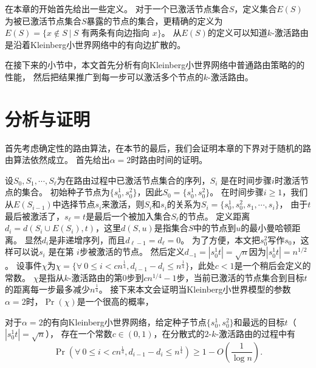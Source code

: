 在本章的开始首先给出一些定义。
对于一个已激活节点集合$S$，定义集合$E(S)$为被已激活节点集合$S$暴露的节点的集合，更精确的定义为
$E(S) = \{x\notin S\ |\ S \mbox{ 有两条有向边指向 } x\}$。
从$E(S)$的定义可以知道$k$-激活路由是沿着Kleinberg小世界网络中的有向边扩散的。

在接下来的小节中，本文首先分析有向Kleinberg小世界网络中普通路由策略的的性能，
然后把结果推广到每一步可以激活多个节点的$k$-激活路由。



\section{分析与证明}
首先考虑确定性的路由算法，在本节的最后，我们会证明本章的下界对于随机的路由算法依然成立。
首先给出$\alpha = 2$时路由时间的证明。

设$S_0, S_1,\cdots, S_{\ell}$为在路由过程中已激活节点集合的序列，$S_i$ 是在时间步骤$i$时激活节点的集合。
初始种子节点为$\{s_0^1,s_0^2\}$，因此$S_0 = \{s_0^1,s_0^2\}$。
在时间步骤$i \geq 1$，我们从$E(S_{i-1})$中选择节点$s_{i}$来激活，则$S_i$和$s_i$的关系为$S_i = \{s_0^1,s_0^2,s_1,\cdots,s_{i}\}$，
由于$t$最后被激活了，$s_{\ell}=t$是最后一个被加入集合$S_{\ell}$的节点。
定义距离$d_i = d(S_i \cup E(S_i),t)$，这里$d(S,u)$是指集合$S$中的节点到$u$的最小曼哈顿距离。
显然$d_i$是非递增序列，而且$d_{\ell-1} = d_{\ell}= 0$。
为了方便，本文把$s_0^2$写作$s_0$，这样可以说$s_i$ 是在第 $i$步被激活的节点。
然后定义$d_{-1} = |s_0^1t| = \sqrt{n}$因为$|s_0^1t| = n^{1/2}$。
设事件$\chi$为$\chi = \{\forall~0 \leq i < cn^{\frac{1}{4}}, d_{i-1}-d_{i}\leq n^{\frac{1}{4}}\}$，此处$c<1$是一个稍后会定义的常数。
$\chi$是指从$k$-激活路由的第$0$步到$cn^{1/4}-1$步，当前已激活的节点集合到目标$t$的距离每一步最多减少$n^{\frac{1}{4}}$。
接下来本文会证明当Kleinberg小世界模型的参数$\alpha = 2$时，$\Pr(\chi)$是一个很高的概率，



\begin{lemma}
\label{lem:routing}
对于$\alpha = 2$的有向Kleinberg小世界网络，给定种子节点$\{s_0^1,s_0^2\}$和最远的目标$t$（$|s_0^1t| = \sqrt{n}$），
存在一个常数$c \in (0,1)$，在分散式的$2$-$k$-激活路由的过程中有
$$\Pr(\forall~0 \leq i < cn^{\frac{1}{4}}, d_{i-1}-d_{i}\leq n^{\frac{1}{4}})\geq 1-O(\frac{1}{\log n}).$$
\end{lemma}


